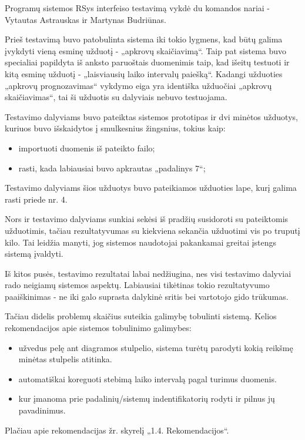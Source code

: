 Programų sistemos RSys interfeiso testavimą vykdė du komandos nariai -
Vytautas Astrauskas ir Martynas Budriūnas.

Prieš testavimą buvo patobulinta sistema iki tokio lygmens, kad būtų galima
įvykdyti vieną esminę užduotį - „apkrovų skaičiavimą“. Taip pat sistema
buvo specialiai papildyta iš anksto paruoštais duomenimis taip, kad išeitų testuoti
ir kitą esminę užduotį - „laisviausių laiko intervalų paiešką“. Kadangi
užduoties „apkrovų prognozavimas“ vykdymo eiga yra identiška užduočiai 
„apkrovų skaičiavimas“, tai ši užduotis su dalyviais nebuvo testuojama.

Testavimo dalyviams buvo pateiktas sistemos prototipas ir dvi minėtos užduotys,
kuriuos buvo išskaidytos į smulkesnius žingsnius, tokius kaip:
\begin{itemize}
  \item importuoti duomenis iš pateikto failo;
  \item rasti, kada labiausiai buvo apkrautas „padalinys 7“;
\end{itemize}

Testavimo dalyviams šios užduotys buvo pateikiamos užduoties lape, kurį galima
rasti priede nr. 4.

Nors ir testavimo dalyviams sunkiai sekėsi iš pradžių susidoroti su pateiktomis
užduotimis, tačiau rezultatyvumas su kiekviena sekančia užduotimi vis po truputį
kilo. Tai leidžia manyti, jog sistemos naudotojai pakankamai greitai
įstengs sistemą įvaldyti.

Iš kitos pusės,
testavimo rezultatai labai nedžiugina, nes visi testavimo dalyviai rado
neigiamų sistemos aspektų. Labiausiai tikėtinas tokio rezultatyvumo paaiškinimas - 
ne iki galo suprasta dalykinė sritis bei vartotojo gido trūkumas.

Tačiau didelis problemų skaičius suteikia galimybę tobulinti sistemą. Kelios
rekomendacijos apie sistemos tobulinimo galimybes:
\begin{itemize}
  \item užvedus pelę ant diagramos stulpelio, sistema turėtų parodyti kokią
  	reikšmę minėtas stulpelis atitinka.
  \item automatiškai koreguoti stebimą laiko intervalą pagal turimus duomenis.
  \item kur įmanoma prie padalinių/sistemų indentifikatorių rodyti ir pilnus jų
   	pavadinimus.
\end{itemize}

Plačiau apie rekomendacijas žr. skyrelį „1.4. Rekomendacijos“.
